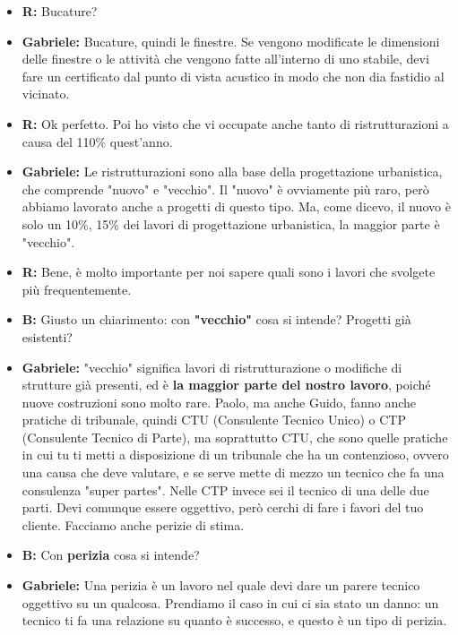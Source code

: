 \documentclass{elegantbook}
\begin{document}
\begin{itemize}
		\item\textbf{R}\textbf{:} Bucature?
		\item\textbf{Gabriele}\textbf{:} Bucature, quindi le finestre. Se vengono modificate le dimensioni delle finestre o le attività che vengono fatte all'interno
                    di uno stabile, devi fare un certificato dal punto di vista acustico in modo che non dia fastidio al vicinato.
		\item\textbf{R}\textbf{:} Ok perfetto. Poi ho visto che vi occupate anche tanto di ristrutturazioni a causa del 110\% quest'anno.
		\item\textbf{Gabriele}\textbf{:} Le ristrutturazioni sono alla base della progettazione urbanistica, che comprende "nuovo" e "vecchio".
                    Il "nuovo" è ovviamente più raro, però abbiamo lavorato anche a progetti di questo tipo. Ma, come dicevo, il nuovo è solo un 10\%, 15\% dei lavori di
                    progettazione urbanistica, la maggior parte è "vecchio".
		\item\textbf{R}\textbf{:} Bene, è molto importante per noi sapere quali sono i lavori che svolgete più frequentemente.
		\item\textbf{B}\textbf{:} Giusto un chiarimento: con \textbf{ "vecchio" } cosa si intende? Progetti già esistenti?
		\item\textbf{Gabriele}\textbf{:} "vecchio" significa lavori di ristrutturazione o modifiche di strutture già presenti, ed è
                    \textbf{ la maggior parte del nostro lavoro}, poiché nuove costruzioni sono molto rare.
                    Paolo, ma anche Guido, fanno anche pratiche di tribunale, quindi CTU (Consulente Tecnico Unico) o CTP (Consulente Tecnico di Parte), ma soprattutto CTU,
                    che sono quelle pratiche in cui tu ti metti a disposizione di un tribunale che ha un contenzioso, ovvero una causa che deve valutare, e se serve mette di
                    mezzo un tecnico che fa una consulenza "super partes". Nelle CTP invece sei il tecnico di una delle due parti. Devi comunque essere oggettivo,
                    però cerchi di fare i favori del tuo cliente. Facciamo anche perizie di stima.
		\item\textbf{B}\textbf{:} Con \textbf{perizia} cosa si intende? 
		\item\textbf{Gabriele}\textbf{:} Una perizia è un lavoro nel quale devi dare un parere tecnico oggettivo su un qualcosa.
                    Prendiamo il caso in cui ci sia stato un danno: un tecnico ti fa una relazione su quanto è successo, e questo è un tipo di perizia.

\end{itemize}
\end{document}
